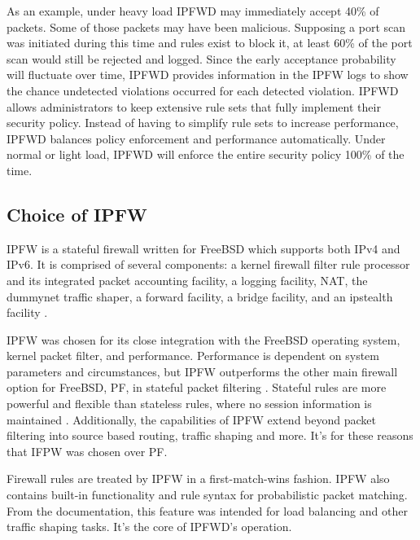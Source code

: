 \documentclass[journal]{IEEEtran}
\begin{document}
  As an example, under heavy load IPFWD may immediately accept 40\% of packets.
  Some of those packets may have been malicious. Supposing a port scan was
  initiated during this time and rules exist to block it, at least 60\% of the
  port scan would still be rejected and logged. Since the early acceptance
  probability will fluctuate over time, IPFWD provides information in the IPFW
  logs to show the chance undetected violations occurred for each detected
  violation. IPFWD allows administrators to keep extensive rule sets that fully
  implement their security policy. Instead of having to simplify rule sets to
  increase performance, IPFWD balances policy enforcement and performance
  automatically. Under normal or light load, IPFWD will enforce the entire
  security policy 100\% of the time.

  \subsection{Choice of IPFW}

    IPFW is a stateful firewall written for FreeBSD which supports both IPv4
    and IPv6. It is comprised of several components: a kernel firewall filter
    rule processor and its integrated packet accounting facility, a logging
    facility, NAT, the dummynet traffic shaper, a forward facility, a bridge
    facility, and an ipstealth facility \cite{freebsdhandbook}.

    IPFW was chosen for its close integration with the FreeBSD operating
    system, kernel packet filter, and performance. Performance is dependent on
    system parameters and circumstances, but IPFW outperforms the other main
    firewall option for FreeBSD, PF, in stateful packet filtering
    \cite{ipfwvspf}. Stateful rules are more powerful and flexible than
    stateless rules, where no session information is maintained
    \cite{networksecurity}.  Additionally, the capabilities of IPFW extend
    beyond packet filtering into source based routing, traffic shaping and
    more. It's for these reasons that IFPW was chosen over PF.

    Firewall rules are treated by IPFW in a first-match-wins fashion. IPFW also
    contains built-in functionality and rule syntax for probabilistic packet
    matching. From the documentation, this feature was intended for load
    balancing and other traffic shaping tasks. It's the core of IPFWD's
    operation. 
\end{document}
